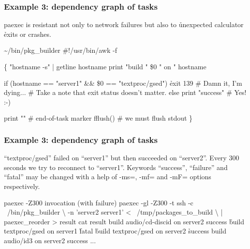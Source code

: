 \documentclass[hyperref={colorlinks=true}]{beamer}
\begin{document}
\begin{frame}[fragile]
  \frametitle{Example 3: dependency graph of tasks}
paexec is resistant not only to network failures but also to
\h{unexpected} calculator \h{exits or crashes}.
  \begin{block}{}
      \begin{CodeSmall}{\~{}/bin/pkg\_builder}
#!/usr/bin/awk -f

\{
   "hostname -s" | getline hostname
   print "build " \$0 " on " hostname

   if (hostname == "server1" && \$0 == "textproc/gsed")
      \h{exit 139}
      # Damn it, I'm dying...
      # Take a note that exit status doesn't matter.
   else
      print "success" # Yes! :-)

   print ""        # end-of-task marker
   fflush()        # we must flush stdout
\}
      \end{CodeSmall}
  \end{block}
\end{frame}

\begin{frame}[fragile]
  \frametitle{Example 3: dependency graph of tasks}
``textproc/gsed'' failed on ``server1'' but then succeeded on ``server2''.
Every 300 seconds we try to reconnect to ``server1''. Keywords ``success'',
``failure'' and ``fatal'' may be changed with a help of -ms=, -mf= and
-mF= options respectively.
  \begin{block}{}
      \begin{CodeSmall}{paexec -Z300 invocation (with failure)}
\prompt{\$} paexec -gl -Z300 -t ssh -c ~/bin/pkg_builder \textbackslash
      -n 'server2 server1' < ~/tmp/packages_to_build \textbackslash
      | paexec_reorder > result
\prompt{\$} cat result
build audio/cd-discid on server2
success
\h{build textproc/gsed on server1}
\h{fatal}
\h{build textproc/gsed on server2}
\h{success}
build audio/id3 on server2
success
...
\prompt{\$}
      \end{CodeSmall}
  \end{block}
\end{frame}
\end{document}
